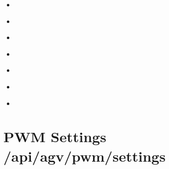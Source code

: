 \documentclass[letterpaper,10pt,english]{sphinxmanual}
\begin{document}
\sphinxAtStartPar
{}
\begin{itemize}
\item {} 
\sphinxAtStartPar
{\hyperref[\detokenize{agv_rest_api_pwm:get-api-agv-pwm-settings}]{}}

\item {} 
\sphinxAtStartPar
{\hyperref[\detokenize{agv_rest_api_pwm:post-api-agv-pwm-enable}]{}}

\item {} 
\sphinxAtStartPar
{\hyperref[\detokenize{agv_rest_api_pwm:post-api-agv-pwm-setactiveservos}]{}}

\item {} 
\sphinxAtStartPar
{\hyperref[\detokenize{agv_rest_api_pwm:post-api-agv-pwm-channel-setposition}]{}}

\item {} 
\sphinxAtStartPar
{\hyperref[\detokenize{agv_rest_api_pwm:post-api-agv-pwm-channel-setlimits}]{}}

\item {} 
\sphinxAtStartPar
{\hyperref[\detokenize{agv_rest_api_pwm:post-api-agv-pwm-channel-setstartposition}]{}}

\item {} 
\sphinxAtStartPar
{\hyperref[\detokenize{agv_rest_api_pwm:post-api-agv-pwm-channel-setfullsweeptime}]{}}

\end{itemize}


\section{PWM Settings \textendash{} /api/agv/pwm/settings}
\label{\detokenize{agv_rest_api_pwm:pwm-settings-api-agv-pwm-settings}}\label{\detokenize{agv_rest_api_pwm:get-api-agv-pwm-settings}}
\end{document}

